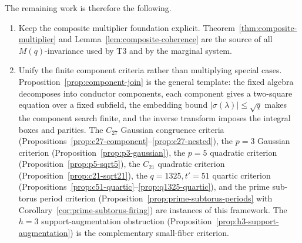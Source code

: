 \documentclass[11pt]{article}
\theoremstyle{plain}
\theoremstyle{definition}
\theoremstyle{remark}
\begin{document}
The remaining work is therefore the following.

\begin{enumerate}
\item Keep the composite multiplier foundation explicit.
Theorem~\ref{thm:composite-multiplier} and
Lemma~\ref{lem:composite-coherence} are the source of all
$M(q)$-invariance used by T3 and by the marginal system.

\item Unify the finite component criteria rather than multiplying special
cases.  Proposition~\ref{prop:component-join} is the general template: the
fixed algebra decomposes into conductor components, each component gives a
two-square equation over a fixed subfield, the embedding bound
$|\sigma(\lambda)|\le\sqrt q$ makes the component search finite, and the
inverse transform imposes the integral boxes and parities.  The $C_{27}$
Gaussian congruence criteria
(Propositions~\ref{prop:c27-component}--\ref{prop:c27-nested}), the $p=3$
Gaussian criterion (Proposition~\ref{prop:p3-gaussian}), the $p=5$ quadratic
criterion (Proposition~\ref{prop:p5-sqrt5}), the $C_{21}$ quadratic criterion
(Proposition~\ref{prop:c21-sqrt21}), the $q=1325,t'=51$ quartic criterion
(Propositions~\ref{prop:c51-quartic}--\ref{prop:q1325-quartic}), and the
prime sub-torus period criterion
(Proposition~\ref{prop:prime-subtorus-periods} with
Corollary~\ref{cor:prime-subtorus-firing}) are instances of this framework.
The $h=3$ support-augmentation obstruction
(Proposition~\ref{prop:h3-support-augmentation}) is the complementary
small-fiber criterion.


\end{enumerate}
\end{document}
